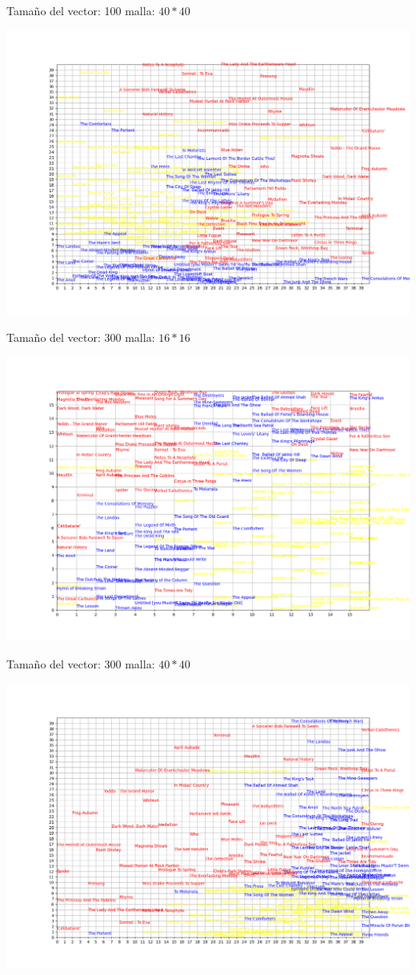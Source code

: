 \documentclass[a4paper, 11pt, oneside]{article}
\begin{document}
Tamaño del vector: 100 malla: $40*40$
\begin{center}
    \includegraphics[scale=0.35]{Imagenes/WShakespeareRKiplingSPlathGlove100G40x40.png}
\end{center}
Tamaño del vector: 300 malla: $16*16$
\begin{center}
    \includegraphics[scale=0.35]{Imagenes/WShakespeareRKiplingSPlathGlove300G16x16.png}
\end{center}
Tamaño del vector: 300 malla: $40*40$
\begin{center}
    \includegraphics[scale=0.35]{Imagenes/WShakespeareRKiplingSPlathGlove300G40x40.png}
\end{center}
\end{document}
